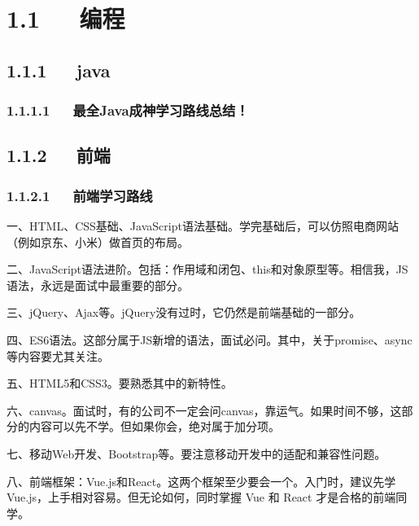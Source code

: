 \documentclass[letterpaper,12pt,english]{sphinxmanual}
\begin{document}
\section{1.1   编程}
\label{\detokenize{004.study/001._u7f16_u7a0b/study:id2}}

\subsection{1.1.1   java}
\label{\detokenize{004.study/001._u7f16_u7a0b/study:java}}

\subsubsection{1.1.1.1   最全Java成神学习路线总结！}
\label{\detokenize{004.study/001._u7f16_u7a0b/study:id3}}


\subsection{1.1.2   前端}
\label{\detokenize{004.study/001._u7f16_u7a0b/study:id4}}

\subsubsection{1.1.2.1   前端学习路线}
\label{\detokenize{004.study/001._u7f16_u7a0b/study:id5}}

一、HTML、CSS基础、JavaScript语法基础。学完基础后，可以仿照电商网站（例如京东、小米）做首页的布局。

二、JavaScript语法进阶。包括：作用域和闭包、this和对象原型等。相信我，JS语法，永远是面试中最重要的部分。

三、jQuery、Ajax等。jQuery没有过时，它仍然是前端基础的一部分。

四、ES6语法。这部分属于JS新增的语法，面试必问。其中，关于promise、async等内容要尤其关注。

五、HTML5和CSS3。要熟悉其中的新特性。

六、canvas。面试时，有的公司不一定会问canvas，靠运气。如果时间不够，这部分的内容可以先不学。但如果你会，绝对属于加分项。

七、移动Web开发、Bootstrap等。要注意移动开发中的适配和兼容性问题。

八、前端框架：Vue.js和React。这两个框架至少要会一个。入门时，建议先学Vue.js，上手相对容易。但无论如何，同时掌握 Vue 和 React 才是合格的前端同学。
\end{document}

